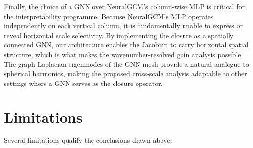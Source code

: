 Finally, the choice of a GNN over NeuralGCM's column-wise MLP \citep{neuralgcm} is critical for the interpretability programme. Because NeuralGCM's MLP operates independently on each vertical column, it is fundamentally unable to express or reveal horizontal scale selectivity. By implementing the closure as a spatially connected GNN, our architecture enables the Jacobian to carry horizontal spatial structure, which is what makes the wavenumber-resolved gain analysis possible. The graph Laplacian eigenmodes of the GNN mesh provide a natural analogue to spherical harmonics, making the proposed cross-scale analysis adaptable to other settings where a GNN serves as the closure operator.

\section{Limitations}

Several limitations qualify the conclusions drawn above.

